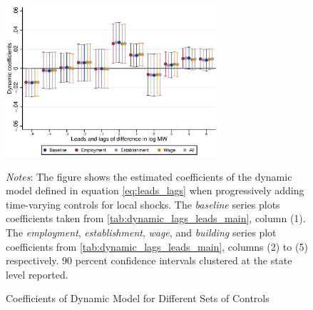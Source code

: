 \clearpage
\begin{figure}[!h]
	\caption{Coefficients of Dynamic Model for Different Sets of Controls}
	\label{fig:}
	\centering
	\includegraphics[width = 0.7\textwidth]{../../analysis/first_differences/output/fd_models_control.eps}
	\begin{minipage}{.95\textwidth} \footnotesize
		\vspace{2mm} 
		\textit{Notes}: The figure shows the estimated coefficients of the dynamic model defined 
		in 	equation \autoref{eq:leads_lags} when progressively adding time-varying controls for 
		local shocks. The \textit{baseline} series plots coefficients taken from 
		\autoref{tab:dynamic_lags_leads_main}, column (1). The \textit{employment}, 
		\textit{establishment}, \textit{wage}, and \textit{building} series plot coefficients 
		from \autoref{tab:dynamic_lags_leads_main}, columns (2) to (5) respectively.
		90 percent confidence intervals clustered at the state level reported.
	\end{minipage}
\end{figure}

